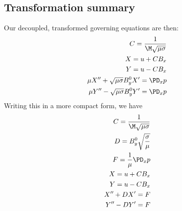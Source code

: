\documentclass[11pt]{article}
\begin{document}
\subsection{Transformation summary}
Our decoupled, transformed governing equations are then:
\begin{equation}\begin{aligned}
C = \frac{1}{\M \sqrt{\mu \sigma}} \\
X = u + C B_x \\
Y = u - C B_x \\
\mu X'' + \sqrt{\mu \sigma} B_y^0 X' = \PD_x p\\
\mu Y'' - \sqrt{\mu \sigma} B_y^0 Y' = \PD_x p\\
\end{aligned} \end{equation}
Writing this in a more compact form, we have
\begin{equation}\begin{aligned}
C = \frac{1}{\M \sqrt{\mu \sigma}} \\
D = B_y^0 \sqrt{\frac{\sigma}{\mu}} \\
F = \frac{1}{\mu} \PD_x p \\
X = u + C B_x \\
Y = u - C B_x \\
X'' + D X' = F \\
Y'' - D Y' = F \\
\end{aligned} \end{equation}
\end{document}
